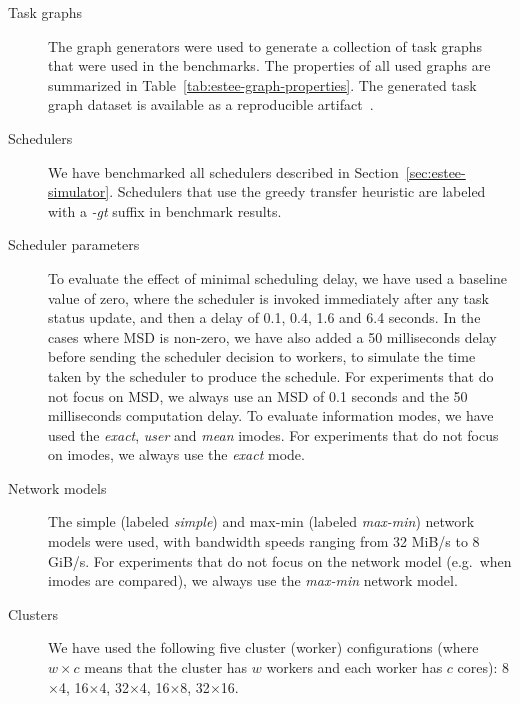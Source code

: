 \begin{description}
	\item[Task graphs] The \estee{} graph generators were used to generate a collection of task graphs
	that were used in the benchmarks. The properties of all used graphs are summarized in Table~\ref{tab:estee-graph-properties}.
	The generated task graph dataset is available as a reproducible artifact~\cite{estee_graphs}.
	\item[Schedulers] We have benchmarked all schedulers described in Section~\ref{sec:estee-simulator}.
	Schedulers that use the greedy transfer heuristic are labeled with a \emph{-gt} suffix in benchmark
	results.
	\item[Scheduler parameters] To evaluate the effect of minimal scheduling delay, we have used a baseline
	value of zero, where the scheduler is invoked immediately after any task status update, and then
	a delay of 0.1, 0.4, 1.6 and 6.4 seconds. In the cases where MSD is non-zero, we have also added
	a 50 milliseconds delay before sending the scheduler decision to workers, to simulate the time
	taken by the scheduler to produce the schedule. For experiments that do not focus on MSD, we
	always use an MSD of 0.1 seconds and the 50 milliseconds computation delay.
	To evaluate information modes, we have used the \emph{exact}, \emph{user} and \emph{mean} imodes.
	For experiments that do not focus on imodes, we always use the \emph{exact} mode.
	\item[Network models] The simple (labeled \emph{simple}) and max-min (labeled \emph{max-min}) network
	models were used, with bandwidth speeds ranging from 32 MiB/s to 8 GiB/s. For experiments that do
	not focus on the network model (e.g.\ when imodes are compared), we always use the \emph{max-min}
	network model.
	\item[Clusters] We have used the following five cluster (worker) configurations
	(where $w \times c$ means that the cluster has $w$ workers and each worker has $c$ cores):  8$\times$4,
		16$\times$4, 32$\times$4, 16$\times$8, 32$\times$16.
\end{description}

